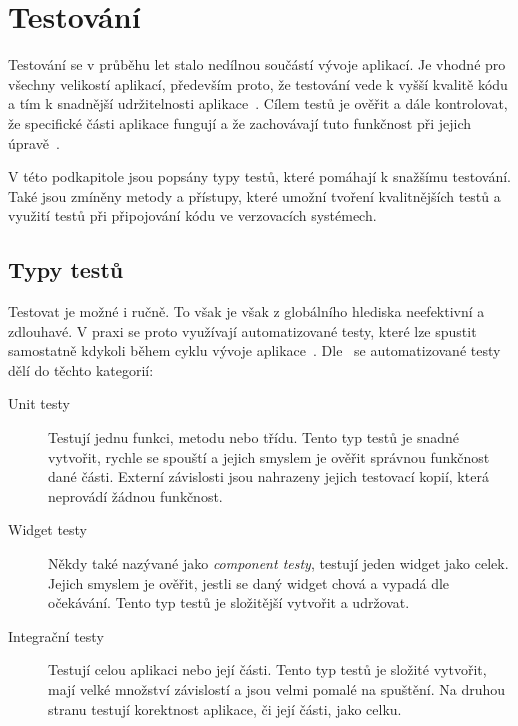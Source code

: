 \section{Testování}

Testování se v průběhu let stalo nedílnou součástí vývoje aplikací.
Je vhodné pro všechny velikostí aplikací,
především proto,
že testování vede k vyšší kvalitě kódu
a tím k snadnější udržitelnosti aplikace~\cite{testing_quality}.
Cílem testů je ověřit a dále kontrolovat,
že specifické části aplikace fungují
a že zachovávají tuto funkčnost při jejich úpravě~\cite{testing_quality}.
\emph{}~\cite[strana~31]{martin_clean_architecture}

V této podkapitole jsou popsány typy testů,
které pomáhají k snažšímu testování.
Také jsou zmíněny metody a přístupy,
které umožní tvoření kvalitnějších testů
a využití testů při připojování kódu ve verzovacích systémech.

\subsection{Typy testů}

Testovat je možné i ručně.
To však je však z globálního hlediska neefektivní a zdlouhavé.
V praxi se proto využívají automatizované testy,
které lze spustit samostatně kdykoli během cyklu vývoje
aplikace~\cite{testing_flutter}.
Dle~\cite{testing_flutter} se automatizované testy dělí do těchto kategorií:

\begin{description}
    \item[Unit testy] Testují jednu funkci, metodu nebo třídu.
    Tento typ testů je snadné vytvořit,
    rychle se spouští
    a jejich smyslem je ověřit správnou funkčnost dané části.
    Externí závislosti jsou nahrazeny jejich testovací kopií,
    která neprovádí žádnou funkčnost.
    \item[Widget testy] Někdy také nazývané jako \emph{component testy},
    testují jeden widget jako celek.
    Jejich smyslem je ověřit,
    jestli se daný widget chová a vypadá dle očekávání.
    Tento typ testů je složitější vytvořit a udržovat.
    \item[Integrační testy] Testují celou aplikaci nebo její části.
    Tento typ testů je složité vytvořit,
    mají velké množství závislostí a jsou velmi pomalé na spuštění.
    Na druhou stranu testují korektnost aplikace,
    či její části,
    jako celku.
\end{description}

